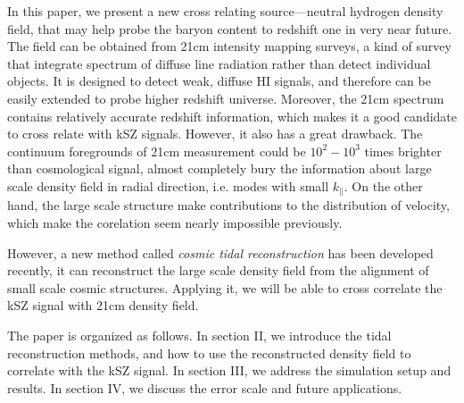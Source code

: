 In this paper, we present a new cross relating source---neutral hydrogen density field, 
that may help probe the baryon content to redshift one in very near future.
The field can be obtained from 21cm intensity mapping surveys, a kind of survey that integrate spectrum of diffuse line radiation rather than detect individual objects. 
It is designed to detect weak, diffuse HI signals, and therefore can be easily extended to probe higher redshift universe.
Moreover, the 21cm spectrum contains relatively accurate redshift information, which makes it a good candidate to cross relate with kSZ signals.
However, it also has a great drawback. The continuum foregrounds of 21cm measurement could be $10^2 - 10^3$ times brighter than cosmological signal, 
almost completely bury the information about large scale density field in radial direction, i.e. modes with small $k_\parallel$. 
On the other hand, the large scale structure make contributions to the distribution of velocity, which make the corelation seem nearly impossible previously.

However, a new method called {\it cosmic tidal reconstruction} has been 
developed recently\cite{2012:pen}\cite{2015:zhu}, 
it can reconstruct the large scale density field from the alignment of small 
scale cosmic structures. Applying it, we will be able to cross correlate the kSZ signal with 21cm density field.

The paper is organized as follows. In section II, we introduce the tidal reconstruction methods, and how to use the reconstructed density field to correlate with the kSZ signal.
In section III, we address the simulation setup and results. 
In section IV, we discuss the error scale and future applications.
